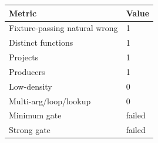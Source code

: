 \begin{tabular}{ll}
\toprule
Metric & Value \\
\midrule
Fixture-passing natural wrong & 1 \\
Distinct functions & 1 \\
Projects & 1 \\
Producers & 1 \\
Low-density & 0 \\
Multi-arg/loop/lookup & 0 \\
Minimum gate & failed \\
Strong gate & failed \\
\bottomrule
\end{tabular}
